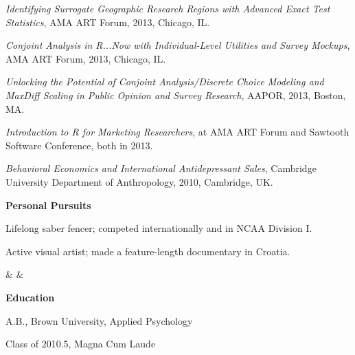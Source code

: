 \documentclass{res}
\begin{document}
{\begin{resume}
\begin{minipage}{7.6in}
\begin{list}{}{%
     \setlength{\labelwidth}{0pt}%
     \setlength{\itemsep}{-2pt}%
     \setlength{\leftmargin}{1em}%
     \setlength{\itemindent}{-1em}%
   }
\item {\it Identifying Surrogate Geographic Research Regions with Advanced Exact Test Statistics}, AMA ART Forum, 2013, Chicago, IL.%
\item {\it Conjoint Analysis in R...Now with Individual-Level Utilities and Survey Mockups}, AMA ART Forum, 2013, Chicago, IL.%
\item {\it Unlocking the Potential of Conjoint Analysis/Discrete Choice Modeling and MaxDiff Scaling in Public Opinion and Survey Research}, AAPOR, 2013, Boston, MA.
\item {\it Introduction to R for Marketing Researchers}, at AMA ART Forum and Sawtooth Software Conference, both in 2013.
\item {\it Behavioral Economics and International Antidepressant Sales}, Cambridge University Department of Anthropology, 2010, Cambridge, UK.
\end{list}

\vspace{8mm}

\begin{tabular}{{}{}{}}
\hspace{-2.75mm}
{\begin{minipage}{4.5in}
\textbf{Personal Pursuits\hspace{2mm}}\hrulefill
\vspace{3mm}
\begin{list}{}{\leftmargin=0em}\itemsep-2pt
\item Lifelong saber fencer; competed internationally and in NCAA Division I.
\item Active visual artist; made a feature-length documentary in Croatia.
\end{list}
\end{minipage}}
& {\hspace{1mm}} 
&
{\begin{minipage}{2.7in}
\textbf{Education\hspace{2mm}}\hrulefill
\vspace{1.8mm}
\begin{list}{}{\leftmargin=0em}\itemsep-2pt
\item A.B., Brown University, Applied Psychology
\item Class of 2010.5, Magna Cum Laude
\end{list}
\end{minipage}}
\end{tabular}


\end{minipage}
\end{resume}}
\end{document}
